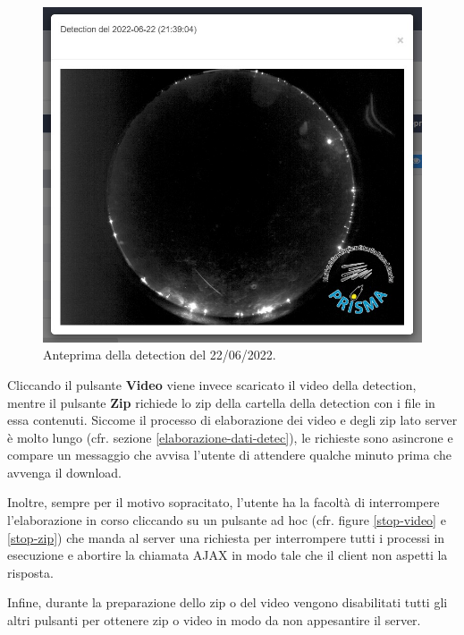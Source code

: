 \begin{figure}[H]
    \begin{center}
    \includegraphics[width=\textwidth]{images/detec-preview.jpg}
    \caption{Anteprima della detection del 22/06/2022.}
    \end{center}
\end{figure}

Cliccando il pulsante \textbf{Video} viene invece scaricato il video della detection, mentre il pulsante \textbf{Zip} richiede lo zip della cartella della detection con i file in essa contenuti. Siccome il processo di elaborazione dei video e degli zip lato server è molto lungo (cfr. sezione \ref{elaborazione-dati-detec}), le richieste sono asincrone e compare un messaggio che avvisa l'utente di attendere qualche minuto prima che avvenga il download.

Inoltre, sempre per il motivo sopracitato, l'utente ha la facoltà di interrompere l'elaborazione in corso cliccando su un pulsante ad hoc (cfr. figure \ref{stop-video} e \ref{stop-zip}) che manda al server una richiesta per interrompere tutti i processi in esecuzione e abortire la chiamata AJAX in modo tale che il client non aspetti la risposta.

Infine, durante la preparazione dello zip o del video vengono disabilitati tutti gli altri pulsanti per ottenere zip o video in modo da non appesantire il server.

